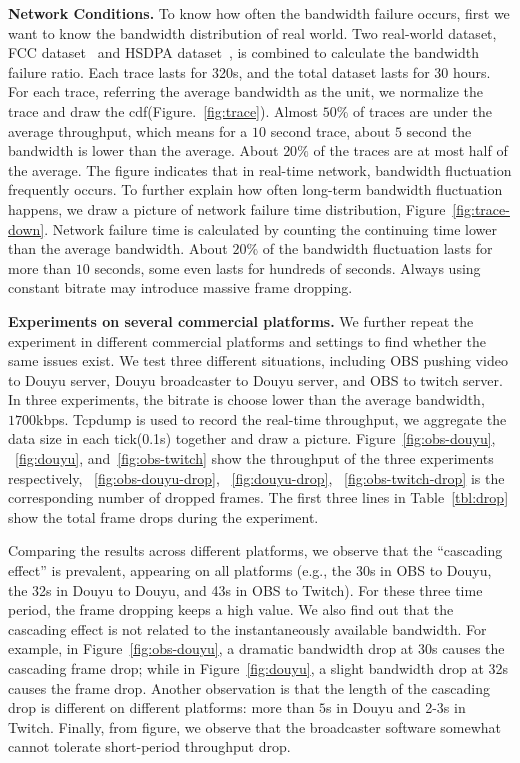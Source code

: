 
\textbf{Network Conditions.} To know how often the bandwidth failure occurs, first we want to know the bandwidth distribution of real world. Two real-world dataset, FCC dataset~\cite{FCC_dataset} and HSDPA dataset~\cite{HSDPA_dataset}, is combined to calculate the bandwidth failure ratio. Each trace lasts for 320s, and the total dataset lasts for $30$ hours. For each trace, referring the average bandwidth as the unit, we normalize the trace and draw the cdf(Figure.~\ref{fig:trace}). Almost $50\%$ of traces are under the average throughput, which means for a $10$ second trace, about $5$ second the bandwidth is lower than the average. About $20\%$ of the traces are at most half of the average. The figure indicates that in real-time network, bandwidth fluctuation frequently occurs. To further explain how often long-term bandwidth fluctuation happens, we draw a picture of network failure time distribution, Figure~\ref{fig:trace-down}. Network failure time is calculated by counting the continuing time lower than the average bandwidth. About $20\%$ of the bandwidth fluctuation lasts for more than $10$ seconds, some even lasts for hundreds of seconds. Always using constant bitrate may introduce massive frame dropping.


\textbf{Experiments on several commercial platforms.} We further repeat the experiment in different commercial platforms and settings to find whether the same issues exist. We test three different situations, including OBS pushing video to Douyu server, Douyu broadcaster to Douyu server, and OBS to twitch server. In three experiments, the bitrate is choose lower than the average bandwidth, $1700$kbps. Tcpdump is used to record the real-time throughput, we aggregate the data size in each tick(0.1s) together and draw a picture.
Figure~\ref{fig:obs-douyu}, ~\ref{fig:douyu}, and~\ref{fig:obs-twitch} show the throughput of the three experiments respectively, ~\ref{fig:obs-douyu-drop}, ~\ref{fig:douyu-drop}, ~\ref{fig:obs-twitch-drop} is the corresponding number of dropped frames. The first three lines in Table~\ref{tbl:drop} show the total frame drops during the experiment.

Comparing the results across different platforms, we observe that the ``cascading effect'' is prevalent, appearing on all platforms (e.g., the 30s in OBS to Douyu, the 32s in Douyu to Douyu, and 43s in OBS to Twitch). For these three time period, the frame dropping keeps a high value. We also find out that the cascading effect is not related to the instantaneously available bandwidth. For example, in Figure~\ref{fig:obs-douyu}, a dramatic bandwidth drop at 30s causes the cascading frame drop; while in Figure~\ref{fig:douyu}, a slight bandwidth drop at 32s causes the frame drop. Another observation is that the length of the cascading drop is different on different platforms: more than $5$s in Douyu and 2-3s in Twitch. Finally, from figure, we observe that the broadcaster software somewhat cannot tolerate short-period throughput drop.


